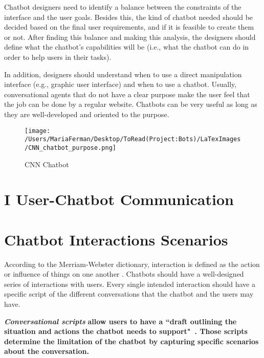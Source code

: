 \documentclass[a4paper,10pt]{article}
\begin{document}
Chatbot designers need to identify a balance between the constraints of the interface and the user goals. Besides this, the kind of chatbot needed should be decided based on the final user requirements, and if it is feasible to create them or not. After finding this balance and making this analysis, the designers should define what the chatbot's capabilities will be (i.e., what the chatbot can do in order to help users in their tasks). 

In addition, designers should understand when to use a direct manipulation interface (e.g., graphic user interface) and when to use a chatbot. Usually, conversational agents that do not have a clear purpose make the user feel that the job can be done by a regular website. Chatbots can be very useful as long as they are well-developed and oriented to the purpose.  


\begin{figure}
\centering
\texttt{[image: /Users/MariaFerman/Desktop/ToRead(Project:Bots)/LaTexImages/CNN\_chatbot\_purpose.png]}
\caption{CNN Chatbot}
\label{FigurePurpose}
\end{figure}

\section*{I User-Chatbot Communication}

\section{Chatbot Interactions Scenarios}

According to the Merriam-Webster dictionary, interaction is defined as the action or influence of things on one another \cite{merriam-webster}.
Chatbots should have a well-designed series of interactions with users. Every single intended interaction should have a specific script of the different conversations that the chatbot and the users may have. 

\textbf{\textit{Conversational scripts}} \textbf{allow users to have a ``draft outlining the situation and actions the chatbot needs to support"~\cite{CaseStudy}. Those scripts determine the limitation of the chatbot by capturing specific scenarios about the conversation.} 
\end{document}
